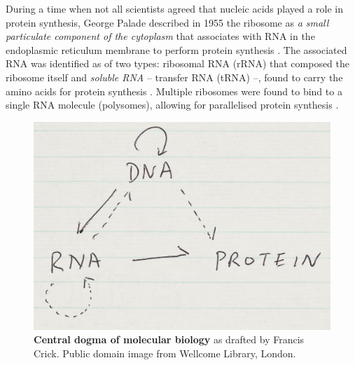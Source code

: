During a time when not all scientists agreed that nucleic acids played a role in protein synthesis, George Palade described in 1955 the ribosome as \emph{a small particulate component of the cytoplasm} that associates with RNA in the endoplasmic reticulum membrane to perform protein synthesis \cite{palade:1955tf,jacob:1961uh}. The associated RNA was identified as of two types: ribosomal RNA (rRNA) that composed the ribosome itself and \emph{soluble RNA} -- transfer RNA (tRNA) --, found to carry the amino acids for protein synthesis \cite{hoagland:1958vm,jacob:1961uh}. Multiple ribosomes were found to bind to a single RNA molecule (polysomes), allowing for parallelised protein synthesis \cite{warner:1963uj}.

\begin{figure}
  \includegraphics[width=\linewidth]{images/intro/crick-central-dogma cropped}
  \caption[Central dogma of molecular biology]{\textbf{Central dogma of molecular biology} as drafted by Francis Crick. Public domain image from Wellcome Library, London.}
  \label{fig:central-dogma}
\end{figure}

